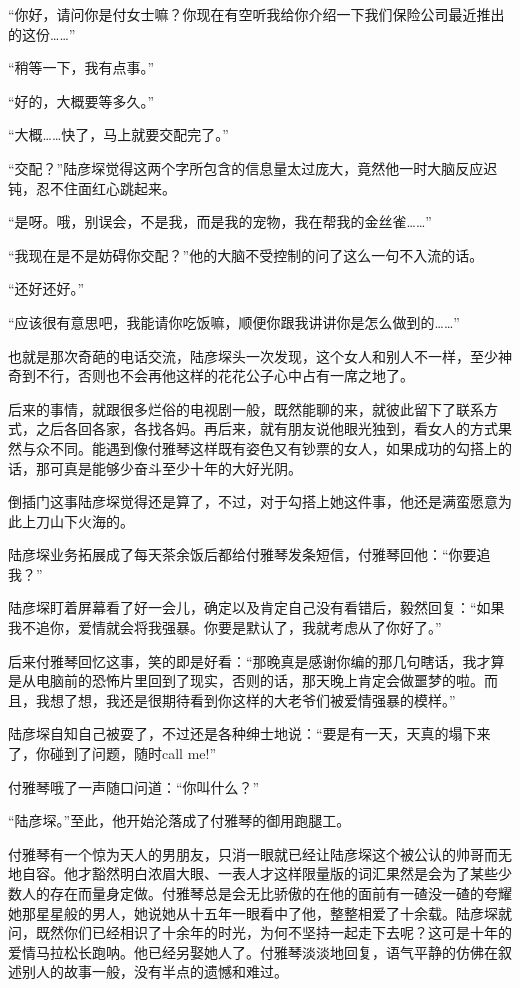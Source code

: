 \documentclass[11pt,a4paper]{article}
\begin{document}
“你好，请问你是付女士嘛？你现在有空听我给你介绍一下我们保险公司最近推出的这份……”﻿﻿

“稍等一下，我有点事。”﻿﻿

“好的，大概要等多久。”﻿﻿

“大概……快了，马上就要交配完了。”﻿﻿

“交配？”陆彦堔觉得这两个字所包含的信息量太过庞大，竟然他一时大脑反应迟钝，忍不住面红心跳起来。﻿﻿

“是呀。哦，别误会，不是我，而是我的宠物，我在帮我的金丝雀……”﻿﻿

“我现在是不是妨碍你交配？”他的大脑不受控制的问了这么一句不入流的话。﻿﻿

“还好还好。”﻿

“应该很有意思吧，我能请你吃饭嘛，顺便你跟我讲讲你是怎么做到的……”﻿﻿

也就是那次奇葩的电话交流，陆彦堔头一次发现，这个女人和别人不一样，至少神奇到不行，否则也不会再他这样的花花公子心中占有一席之地了。﻿﻿

后来的事情，就跟很多烂俗的电视剧一般，既然能聊的来，就彼此留下了联系方式，之后各回各家，各找各妈。再后来，就有朋友说他眼光独到，看女人的方式果然与众不同。能遇到像付雅琴这样既有姿色又有钞票的女人，如果成功的勾搭上的话，那可真是能够少奋斗至少十年的大好光阴。﻿﻿

倒插门这事陆彦堔觉得还是算了，不过，对于勾搭上她这件事，他还是满蛮愿意为此上刀山下火海的。﻿﻿

陆彦堔业务拓展成了每天茶余饭后都给付雅琴发条短信，付雅琴回他：“你要追我？”﻿﻿

陆彦堔盯着屏幕看了好一会儿，确定以及肯定自己没有看错后，毅然回复：“如果我不追你，爱情就会将我强暴。你要是默认了，我就考虑从了你好了。”﻿﻿

后来付雅琴回忆这事，笑的即是好看：“那晚真是感谢你编的那几句瞎话，我才算是从电脑前的恐怖片里回到了现实，否则的话，那天晚上肯定会做噩梦的啦。而且，我想了想，我还是很期待看到你这样的大老爷们被爱情强暴的模样。”﻿﻿

陆彦堔自知自己被耍了，不过还是各种绅士地说：“要是有一天，天真的塌下来了，你碰到了问题，随时call me!”﻿﻿

付雅琴哦了一声随口问道：“你叫什么？”﻿﻿

“陆彦堔。”至此，他开始沦落成了付雅琴的御用跑腿工。﻿﻿

付雅琴有一个惊为天人的男朋友，只消一眼就已经让陆彦堔这个被公认的帅哥而无地自容。他才豁然明白浓眉大眼、一表人才这样限量版的词汇果然是会为了某些少数人的存在而量身定做。付雅琴总是会无比骄傲的在他的面前有一碴没一碴的夸耀她那星星般的男人，她说她从十五年一眼看中了他，整整相爱了十余载。陆彦堔就问，既然你们已经相识了十余年的时光，为何不坚持一起走下去呢？这可是十年的爱情马拉松长跑呐。他已经另娶她人了。付雅琴淡淡地回复，语气平静的仿佛在叙述别人的故事一般，没有半点的遗憾和难过。﻿﻿
\end{document}
